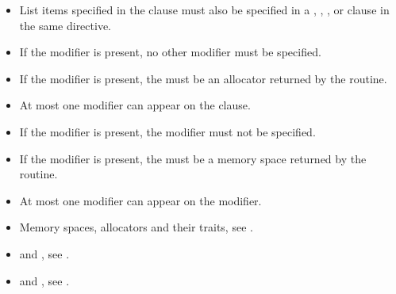 \restrictions
\begin{itemize}
\item List items specified in the  clause must also be specified in a , , ,  or 
       clause in the same directive.
\item If the  modifier is present, no other modifier must be specified.
\item If the  modifier is present, the  must be an allocator returned by the  routine.
\item At most one  modifier can appear on the  clause.
\item If the  modifier is present, the   modifier must not be specified.
\item If the  modifier is present, the  must be a memory space returned by the  routine.
\item At most one  modifier can appear on the  modifier.
\end{itemize}

\crossreferences
\begin{itemize}
\item Memory spaces, allocators and their traits, see .
\item {} and , see .
\item {} and , see .
\end{itemize}
